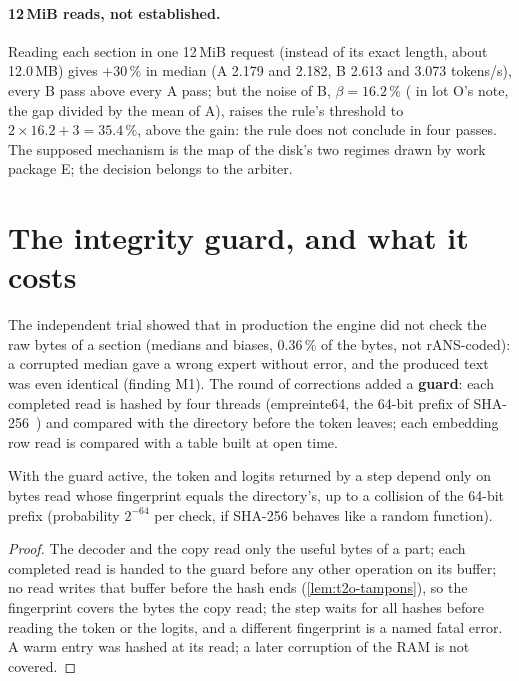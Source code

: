 \paragraph{12\,MiB reads, not established.} Reading each section in one 12\,MiB request (instead of its exact length, about 12.0\,MB) gives +30\,\% in median (A 2.179 and 2.182, B 2.613 and 3.073 tokens/s), every B pass above every A pass; but the noise of B, $\beta = 16.2\,\%$ ( in lot O's note, the gap divided by the mean of A), raises the rule's threshold to $2 \times 16.2 + 3 = 35.4\,\%$, above the gain: the rule does not conclude in four passes. The supposed mechanism is the map of the disk's two regimes drawn by work package E; the decision belongs to the arbiter.

\section{The integrity guard, and what it costs}\label{sec:t2o-garde}

The independent trial showed that in production the engine did not check the raw bytes of a section (medians and biases, 0.36\,\% of the bytes, not rANS-coded): a corrupted median gave a wrong expert without error, and the produced text was even identical (finding M1). The round of corrections added a \textbf{guard}: each completed read is hashed by four threads (empreinte64, the 64-bit prefix of SHA-256~\cite{fips180-4}) and compared with the directory before the token leaves; each embedding row read is compared with a table built at open time.

\begin{proposition}\label{prop:t2o-garde}
With the guard active, the token and logits returned by a step depend only on bytes read whose fingerprint equals the directory's, up to a collision of the 64-bit prefix (probability $2^{-64}$ per check, if SHA-256 behaves like a random function).
\end{proposition}

\begin{proof}
The decoder and the copy read only the useful bytes of a part; each completed read is handed to the guard before any other operation on its buffer; no read writes that buffer before the hash ends (\cref{lem:t2o-tampons}), so the fingerprint covers the bytes the copy read; the step waits for all hashes before reading the token or the logits, and a different fingerprint is a named fatal error. A warm entry was hashed at its read; a later corruption of the RAM is not covered.
\end{proof}


